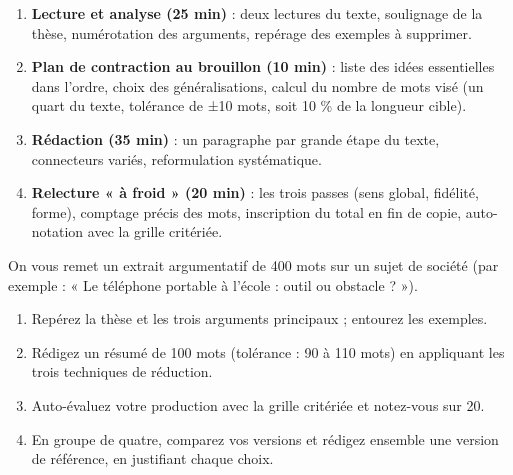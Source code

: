\documentclass[11pt]{article}
\begin{document}
\begin{methode}
\begin{enumerate}
\item \textbf{Lecture et analyse (25 min)} : deux lectures du texte, soulignage de la thèse, numérotation des arguments, repérage des exemples à supprimer.
\item \textbf{Plan de contraction au brouillon (10 min)} : liste des idées essentielles dans l'ordre, choix des généralisations, calcul du nombre de mots visé (un quart du texte, tolérance de ±10 mots, soit 10 \% de la longueur cible).
\item \textbf{Rédaction (35 min)} : un paragraphe par grande étape du texte, connecteurs variés, reformulation systématique.
\item \textbf{Relecture « à froid » (20 min)} : les trois passes (sens global, fidélité, forme), comptage précis des mots, inscription du total en fin de copie, auto-notation avec la grille critériée.
\end{enumerate}
\end{methode}

\begin{exercice}
On vous remet un extrait argumentatif de 400 mots sur un sujet de société (par exemple : « Le téléphone portable à l'école : outil ou obstacle ? »).
\begin{enumerate}
\item Repérez la thèse et les trois arguments principaux ; entourez les exemples.
\item Rédigez un résumé de 100 mots (tolérance : 90 à 110 mots) en appliquant les trois techniques de réduction.
\item Auto-évaluez votre production avec la grille critériée et notez-vous sur 20.
\item En groupe de quatre, comparez vos versions et rédigez ensemble une version de référence, en justifiant chaque choix.
\end{enumerate}
\end{exercice}
\end{document}
